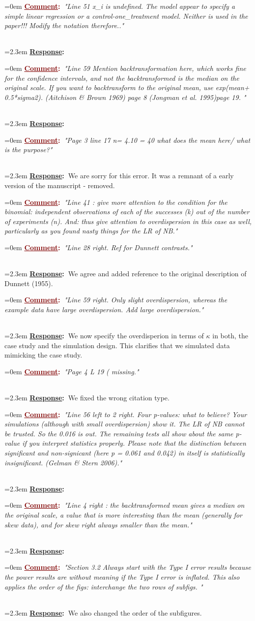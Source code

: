 \documentclass[12pt]{article}
\newcommand{\comment}[1]{
	\vspace{2em} \noindent \hangindent=0em \textbf{\textcolor{Maroon}{\uline{Comment}:~}}\emph{"#1"}
	}
\newcommand{\response}[1]{
	\\[0.25em] 
	\hangindent=2.3em \textbf{\textcolor{NavyBlue}{\uline{Response}:~}}#1 
	}
\begin{document}
\comment{Line 51 x\_i is undefined. The model appear to specify a simple linear regression or a control-one\_treatment model. Neither is used in the paper!!! Modify the notation therefore..}
\response{}

\comment{Line 59 Mention backtransformation here, which works fine for the confidence intervals, and not the backtransformed is the median on the original scale. If you want to backtransform to the original mean, use exp(mean+ 0.5*sigma2). (Aitchison \& Brown 1969) page 8 (Jongman et al. 1995)page 19. }
\response{}

\comment{Page 3 line 17 n= 4.10 = 40 what does the mean here/ what is the purpose?}
\response{We are sorry for this error. It was a remnant of a early version of the manuscript - removed.}

\comment{Line 41 : give more attention to the condition for the binomial: independent observations of each of the successes (k) out of the number of experiments (n).
And: thus give attention to overdispersion in this case as well, particularly as you found nasty things for the LR of  NB.}

\comment{Line 28 right. Ref for Dunnett contrasts.}
\response{We agree and added reference to the original description of Dunnett (1955).}

\comment{Line 59 right. Only slight overdispersion, whereas the example data have large  overdispersion. Add large overdispersion.}
\response{We now specify the overdisperion in terms of $\kappa$ in both, the case study and the simulation design. This clarifies that we simulated data mimicking the case study.}

\comment{Page 4  L 19 ( missing.}
\response{We fixed the wrong citation type.}

\comment{Line 56 left to 2 right. Four p-values: what to believe? Your simulations (although with small overdispersion) show it. The LR of NB cannot be trusted. So the 0.016 is out. The remaining tests all show about the same p-value if you interpret statistics properly. Please note that the distinction between significant and non-signicant (here p = 0.061 and 0.042) in itself is statistically insignificant. (Gelman \& Stern 2006).}
\response{}

\comment{Line 4 right : the backtransformed mean gives a median on the original scale, a value that is more interesting than the mean (generally for skew data),  and for skew right always smaller than the mean.}
\response{}

\comment{Section 3.2
Always start with the Type I error results because the power results are without meaning if the Type I error is inflated. This also applies the order of the figs: interchange the two rows of subfigs. }
\response{We also changed the order of the subfigures.}
\end{document}
